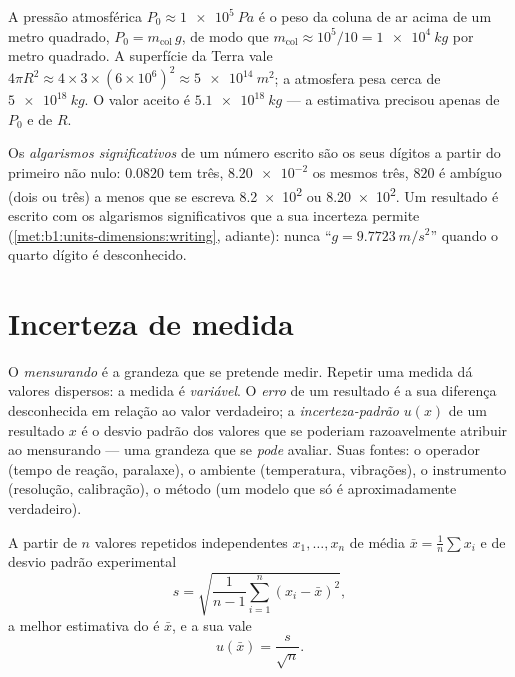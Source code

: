 \begin{example}\label{ex:b1:units-dimensions:atmosphere}
A pressão atmosférica $P_0 \approx \qty{1e5}{Pa}$ é o peso da coluna de ar
acima de um metro quadrado, $P_0 = m_{\text{col}}\,g$, de modo que
$m_{\text{col}} \approx 10^5/10 = \qty{1e4}{kg}$ por metro quadrado. A
superfície da Terra vale $4\pi R^2 \approx 4 \times 3 \times (6\times10^6)^2
\approx \qty{5e14}{m^2}$; a atmosfera pesa cerca de
$\qty{5e18}{kg}$. O valor aceito é $\qty{5.1e18}{kg}$ --- a estimativa
precisou apenas de $P_0$ e de $R$.
\end{example}

\begin{definition}\label{def:b1:units-dimensions:sigfig}
Os \emph{algarismos significativos} de um número escrito são os seus
dígitos a partir do primeiro não nulo: $0.0820$ tem três, $\num{8.20e-2}$
os mesmos três, $820$ é ambíguo (dois ou três) a menos que se escreva
\num{8.2e2} ou \num{8.20e2}. Um resultado é escrito com os algarismos
significativos que a sua incerteza permite (\cref{met:b1:units-dimensions:writing},
adiante): nunca ``$g = \qty{9.7723}{m/s^2}$'' quando o quarto dígito é
desconhecido.
\end{definition}

\section{Incerteza de medida}

\begin{definition}\label{def:b1:units-dimensions:uncertainty}
O \emph{mensurando} é a grandeza que se pretende medir. Repetir uma
medida dá valores dispersos: a medida é \emph{variável}. O \emph{erro} de
um resultado é a sua diferença desconhecida em relação ao valor
verdadeiro; a \emph{incerteza-padrão} $u(x)$ de um resultado $x$ é o
desvio padrão dos valores que se poderiam razoavelmente atribuir ao
mensurando --- uma grandeza que se \emph{pode} avaliar. Suas fontes: o
operador (tempo de reação, paralaxe), o ambiente (temperatura, vibrações),
o instrumento (resolução, calibração), o método (um modelo que só é
aproximadamente verdadeiro).
\end{definition}

\begin{proposition}\label{prop:b1:units-dimensions:typeA}
A partir de $n$ valores repetidos independentes $x_1, \dots, x_n$ de média
$\bar x = \frac1n \sum x_i$ e de desvio padrão experimental
\[
s = \sqrt{\frac{1}{n-1}\sum_{i=1}^n (x_i - \bar x)^2},
\]
a melhor estimativa do  é $\bar x$, e a sua 
vale
\[
u(\bar x) = \frac{s}{\sqrt n} .
\]
\end{proposition}

